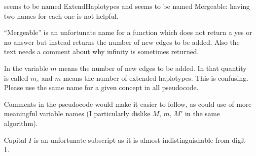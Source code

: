 \begin{point}{} %
 seems to be named ExtendHaplotypes and  seems
to be named Mergeable: having two names for each one is not helpful.
\end{point}


\begin{point}{} %
``Mergeable'' is an unfortunate name for a function which does not
return a yes or no answer but instead returns the number of
new edges to be added. Also the text needs a comment about why
infinity is sometimes returned.
\end{point}


\begin{point}{} %
In  the variable $m$ means the number of new edges to be
added. In  that quantity is called $m_e$ and $m$ means the
number of extended haplotypes. This is confusing. Please use the
same name for a given concept in all pseudocode.
\end{point}


\begin{point}{} %
Comments in the pseudocode would make it easier to follow, as could
use of more meaningful variable names (I particularly dislike $M$, $m$, $M'$
in the same algorithm).
\end{point}


\begin{point}{}
Capital $I$ is an unfortunate subscript as it is almost indistinguishable
from digit 1.
\end{point}

